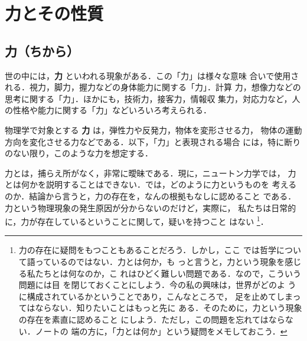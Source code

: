     \section{力とその性質}
        \subsection{力（ちから）}
            世の中には，\textbf{力} といわれる現象がある．この「力」は様々な意味
            合いで使用される．視力，脚力，握力などの身体能力に関する「力」．計算
            力，想像力などの思考に関する「力」．ほかにも，技術力，接客力，情報収
            集力，対応力など，人の性格や能力に関する「力」などいろいろ考えられる．

            物理学で対象とする \textbf{力} は，弾性力や反発力，物体を変形させる力，
            物体の運動方向を変化させる力などである．以下，「力」と表現される場合
            には，特に断りのない限り，このような力を想定する．

            力とは，捕らえ所がなく，非常に曖昧である．現に，ニュートン力学では，
            力とは何かを説明することはできない．では，どのように力というものを
            考えるのか．結論から言うと，力の存在を，なんの根拠もなしに認めること
            である．力という物理現象の発生原因が分からないのだけど，実際に，
            私たちは日常的に，力が存在しているということに関して，疑いを持つこと
            はない
                \footnote{
                    力の存在に疑問をもつこともあることだろう．しかし，ここ
                    では哲学について語っているのではない．力とは何か，も
                    っと言うと，力という現象を感じる私たちとは何なのか，こ
                    れはひどく難しい問題である．なので，こういう問題には目
                    を閉じておくことにしよう．今の私の興味は，世界がどのよ
                    うに構成されているかということであり，こんなところで，
                    足を止めてしまってはならない．知りたいことはもっと先に
                    ある．そのために，力という現象の存在を素直に認めること
                    にしよう．ただし，この問題を忘れてはならない．ノートの
                    端の方に，「力とは何か」という疑問をメモしておこう．
                }．

